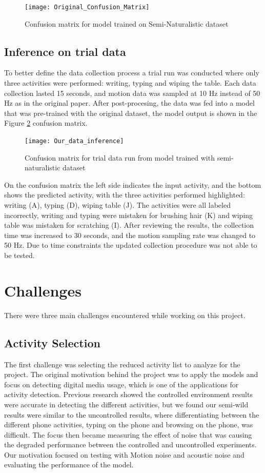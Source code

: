 \documentclass[conference]{IEEEtran}
\begin{document}
	\begin{figure}[h]
		\centering
		\texttt{[image: Original\_Confusion\_Matrix]}
		\caption{Confusion matrix for model trained on Semi-Naturalistic dataset}
		\label{fig: Original_Confusion_Matrix}
	\end{figure}
	
	\subsection{Inference on trial data}
	To better define the data collection process a trial run was conducted where only three activities were performed: writing, typing and wiping the table.
	Each data collection lasted 15 seconds, and motion data was sampled at 10 Hz instead of 50 Hz as in the original paper.
	After post-procesing, the data was fed into a model that was pre-trained with the original dataset, the model output is shown in the Figure \ref{fig: Our_data_inference} confusion matrix.
	
	\begin{figure}[h]
		\centering
		\texttt{[image: Our\_data\_inference]}
		\caption{Confusion matrix for trial data run from model trained with semi-naturalistic dataset}
		\label{fig: Our_data_inference}
	\end{figure}
	
	On the confusion matrix the left side indicates the input activity, and the bottom shows the predicted activity, with the three activities performed highlighted: writing (A), typing (D), wiping table (J). 
	The activities were all labeled incorrectly, writing and typing were mistaken for brushing hair (K) and wiping table was mistaken for scratching (I).
	After reviewing the results, the collection time was increased to 30 seconds, and the motion sampling rate was changed to 50 Hz. 
	Due to time constraints the updated collection procedure was not able to be tested.
	
	\section{Challenges}
	There were three main challenges encountered while working on this project. 
	\subsection{Activity Selection}
	The first challenge was selecting the reduced activity list to analyze for the project.
	The original motivation behind the project was to apply the models and focus on detecting digital media usage, which is one of the applications for activity detection. 
	Previous research showed the controlled environment results were accurate in detecting the different activities, but we found our semi-wild results were similar to the uncontrolled results, where differentiating between the different phone activities, typing on the phone and browsing on the phone, was difficult.
	The focus then became measuring the effect of noise that was causing the degraded performance between the controlled and uncontrolled experiments. Our motivation focused on testing with Motion noise and acoustic noise and evaluating the performance of the model.
	
\end{document}
